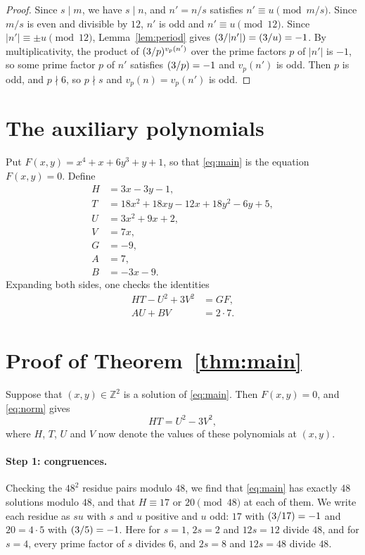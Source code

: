 \documentclass[11pt]{article}
\newcommand{\Z}{\mathbb{Z}}
\newcommand{\leg}[2]{\mathchoice{\biggl(\dfrac{#1}{#2}\biggr)}{(#1/#2)}{(#1/#2)}{(#1/#2)}}
\begin{document}
\begin{proof}
Since $s\mid m$, we have $s\mid n$, and $n'=n/s$ satisfies $n'\equiv u\pmod{m/s}$. Since $m/s$ is even and divisible by $12$, $n'$ is odd and $n'\equiv u\pmod{12}$. Since $|n'|\equiv\pm u\pmod{12}$, Lemma~\ref{lem:period} gives $\leg{3}{|n'|}=\leg{3}{u}=-1$. By multiplicativity, the product of $\leg{3}{p}^{v_p(n')}$ over the prime factors $p$ of $|n'|$ is $-1$, so some prime factor $p$ of $n'$ satisfies $\leg{3}{p}=-1$ and $v_p(n')$ is odd. Then $p$ is odd, and $p\nmid6$, so $p\nmid s$ and $v_p(n)=v_p(n')$ is odd.
\end{proof}

\section{The auxiliary polynomials}

Put $F(x,y)=x^{4}+x+6y^{3}+y+1$, so that \eqref{eq:main} is the equation $F(x,y)=0$. Define
\begin{align*}
H&=3x-3y-1,\\
T&=18x^{2}+18xy-12x+18y^{2}-6y+5,\\
U&=3x^{2}+9x+2,\\
V&=7x,\\
G&=-9,\\
A&=7,\\
B&=-3x-9.
\end{align*}
Expanding both sides, one checks the identities
\begin{align}
HT-U^2+3V^2&=GF,\label{eq:norm}\\
AU+BV&=2\cdot 7.\label{eq:bezout}
\end{align}

\section{Proof of Theorem~\ref{thm:main}}

Suppose that $(x,y)\in\Z^2$ is a solution of \eqref{eq:main}. Then $F(x,y)=0$, and \eqref{eq:norm} gives
\begin{equation}\label{eq:HT}
HT=U^2-3V^2,
\end{equation}
where $H$, $T$, $U$ and $V$ now denote the values of these polynomials at $(x,y)$.

\paragraph{Step 1: congruences.} Checking the $48^2$ residue pairs modulo $48$, we find that \eqref{eq:main} has exactly 48 solutions modulo $48$, and that $H\equiv17\text{ or }20\pmod{48}$ at each of them. We write each residue as $su$ with $s$ and $u$ positive and $u$ odd: $17$ with $\leg{3}{17}=-1$ and $20=4\cdot5$ with $\leg{3}{5}=-1$. Here for $s=1$, $2s=2$ and $12s=12$ divide $48$, and for $s=4$, every prime factor of $s$ divides $6$, and $2s=8$ and $12s=48$ divide $48$.
\end{document}

